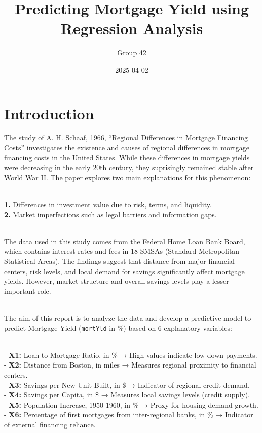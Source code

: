 \documentclass[
  11pt,
]{article}
\title{Predicting Mortgage Yield using Regression Analysis}
\author{Group 42}
\date{2025-04-02}
\begin{document}
\maketitle

\section{Introduction}\label{introduction}

The study of A. H. Schaaf, 1966, ``Regional Differences in Mortgage
Financing Costs'' investigates the existence and causes of regional
differences in mortgage financing costs in the United States. While
these differences in mortgage yields were decreasing in the early 20th
century, they suprisingly remained stable after World War II. The paper
explores two main explanations for this phenomenon:\\
\strut \\
\textbf{1.} Differences in investment value due to risk, terms, and
liquidity.\\
\textbf{2.} Market imperfections such as legal barriers and information
gaps.\\
\strut \\
The data used in this study comes from the Federal Home Loan Bank Board,
which contains interest rates and fees in 18 SMSAs (Standard
Metropolitan Statistical Areas). The findings suggest that distance from
major financial centers, risk levels, and local demand for savings
significantly affect mortgage yields. However, market structure and
overall savings levels play a lesser important role.\\
\strut \\
The aim of this report is to analyze the data and develop a predictive
model to predict Mortgage Yield (\texttt{mortYld} in \%) based on 6
explanatory variables:\\
\strut \\
- \textbf{X1:} Loan-to-Mortgage Ratio, in \% → High values indicate low
down payments.\\
- \textbf{X2:} Distance from Boston, in miles → Measures regional
proximity to financial centers.\\
- \textbf{X3:} Savings per New Unit Built, in \$ → Indicator of regional
credit demand.\\
- \textbf{X4:} Savings per Capita, in \$ → Measures local savings levels
(credit supply).\\
- \textbf{X5:} Population Increase, 1950-1960, in \% → Proxy for housing
demand growth.\\
- \textbf{X6:} Percentage of first mortgages from inter-regional banks,
in \% → Indicator of external financing reliance.
\end{document}
